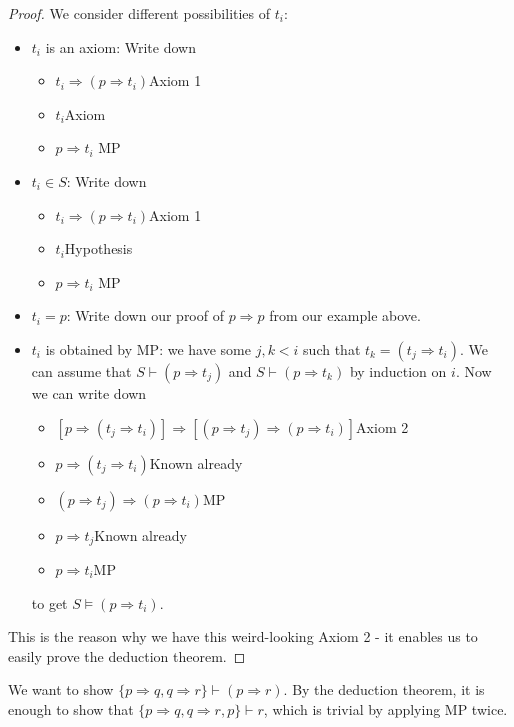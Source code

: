 \documentclass[a4paper]{article}
\begin{document}
\begin{proof}
  We consider different possibilities of $t_i$:
  \begin{itemize}
    \item $t_i$ is an axiom: Write down
      \begin{itemize}
        \item $t_i\Rightarrow (p\Rightarrow t_i)$\hfill Axiom 1
        \item $t_i$\hfill Axiom
        \item $p\Rightarrow t_i$ \hfill MP
      \end{itemize}
    \item $t_i\in S$: Write down
      \begin{itemize}
        \item $t_i\Rightarrow (p\Rightarrow t_i)$\hfill Axiom 1
        \item $t_i$\hfill Hypothesis
        \item $p\Rightarrow t_i$ \hfill MP
      \end{itemize}
    \item $t_i = p$: Write down our proof of $p\Rightarrow p$ from our example above.
    \item $t_i$ is obtained by MP: we have some $j, k< i$ such that $t_k = (t_j\Rightarrow t_i)$. We can assume that $S\vdash (p\Rightarrow t_j)$ and $S\vdash (p\Rightarrow t_k)$ by induction on $i$. Now we can write down
      \begin{itemize}
        \item $[p\Rightarrow (t_j\Rightarrow t_i)]\Rightarrow [(p\Rightarrow t_j)\Rightarrow (p\Rightarrow t_i)]$\hfill Axiom 2
        \item $p\Rightarrow (t_j\Rightarrow t_i)$\hfill Known already
        \item $(p\Rightarrow t_j)\Rightarrow (p\Rightarrow t_i)$\hfill MP
        \item $p\Rightarrow t_j$\hfill Known already
        \item $p\Rightarrow t_i$\hfill MP
      \end{itemize}
      to get $S\models (p\Rightarrow t_i)$.
  \end{itemize}
  This is the reason why we have this weird-looking Axiom 2 - it enables us to easily prove the deduction theorem.
\end{proof}

\begin{eg}
  We want to show $\{p\Rightarrow  q, q\Rightarrow r\} \vdash (p\Rightarrow r)$. By the deduction theorem, it is enough to show that $\{p\Rightarrow q, q\Rightarrow  r, p\}\vdash r$, which is trivial by applying MP twice.
\end{eg}
\end{document}
